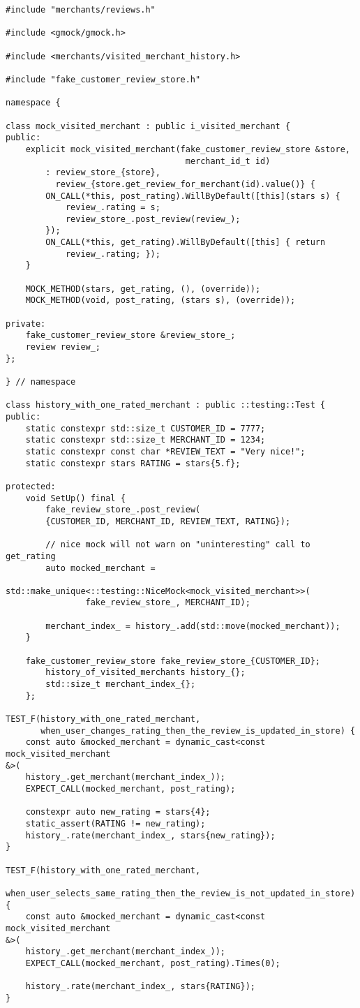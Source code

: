 \begin{lstlisting}[style=styleCXX]
#include "merchants/reviews.h"

#include <gmock/gmock.h>

#include <merchants/visited_merchant_history.h>

#include "fake_customer_review_store.h"

namespace {
	
class mock_visited_merchant : public i_visited_merchant {
public:
	explicit mock_visited_merchant(fake_customer_review_store &store,
									merchant_id_t id)
		: review_store_{store},
		  review_{store.get_review_for_merchant(id).value()} {
		ON_CALL(*this, post_rating).WillByDefault([this](stars s) {
			review_.rating = s;
			review_store_.post_review(review_);
		});
		ON_CALL(*this, get_rating).WillByDefault([this] { return
			review_.rating; });
	}

	MOCK_METHOD(stars, get_rating, (), (override));
	MOCK_METHOD(void, post_rating, (stars s), (override));

private:
	fake_customer_review_store &review_store_;
	review review_;
};

} // namespace

class history_with_one_rated_merchant : public ::testing::Test {
public:
	static constexpr std::size_t CUSTOMER_ID = 7777;
	static constexpr std::size_t MERCHANT_ID = 1234;
	static constexpr const char *REVIEW_TEXT = "Very nice!";
	static constexpr stars RATING = stars{5.f};
	
protected:
	void SetUp() final {
		fake_review_store_.post_review(
		{CUSTOMER_ID, MERCHANT_ID, REVIEW_TEXT, RATING});
		
		// nice mock will not warn on "uninteresting" call to get_rating
		auto mocked_merchant =
			std::make_unique<::testing::NiceMock<mock_visited_merchant>>(
				fake_review_store_, MERCHANT_ID);
				
		merchant_index_ = history_.add(std::move(mocked_merchant));
	}

	fake_customer_review_store fake_review_store_{CUSTOMER_ID};
		history_of_visited_merchants history_{};
		std::size_t merchant_index_{};
	};

TEST_F(history_with_one_rated_merchant,
	   when_user_changes_rating_then_the_review_is_updated_in_store) {
	const auto &mocked_merchant = dynamic_cast<const mock_visited_merchant
&>(
	history_.get_merchant(merchant_index_));
	EXPECT_CALL(mocked_merchant, post_rating);
	
	constexpr auto new_rating = stars{4};
	static_assert(RATING != new_rating);
	history_.rate(merchant_index_, stars{new_rating});
}

TEST_F(history_with_one_rated_merchant,
	   when_user_selects_same_rating_then_the_review_is_not_updated_in_store) {
	const auto &mocked_merchant = dynamic_cast<const mock_visited_merchant
&>(
	history_.get_merchant(merchant_index_));
	EXPECT_CALL(mocked_merchant, post_rating).Times(0);
	
	history_.rate(merchant_index_, stars{RATING});
}
\end{lstlisting}

